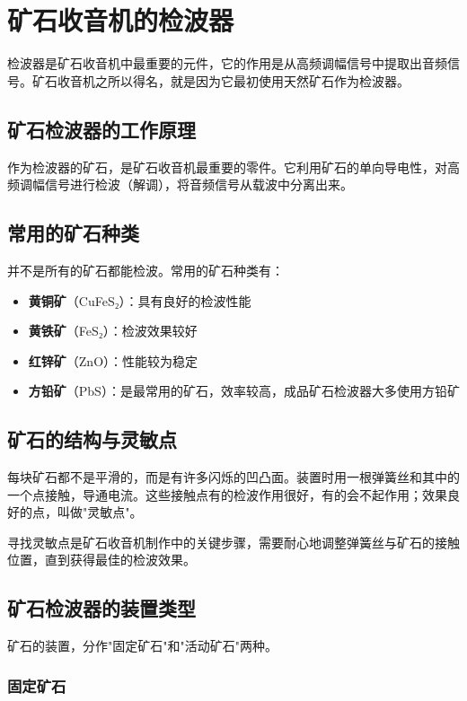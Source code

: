 \documentclass[12pt,UTF8]{ctexbook}
\begin{document}
\chapter{矿石收音机的检波器}

检波器是矿石收音机中最重要的元件，它的作用是从高频调幅信号中提取出音频信号。矿石收音机之所以得名，就是因为它最初使用天然矿石作为检波器。

\section{矿石检波器的工作原理}

作为检波器的矿石，是矿石收音机最重要的零件。它利用矿石的单向导电性，对高频调幅信号进行检波（解调），将音频信号从载波中分离出来。

\section{常用的矿石种类}

并不是所有的矿石都能检波。常用的矿石种类有：

\begin{itemize}
	\item \textbf{黄铜矿}（CuFeS₂）：具有良好的检波性能
	\item \textbf{黄铁矿}（FeS₂）：检波效果较好
	\item \textbf{红锌矿}（ZnO）：性能较为稳定
	\item \textbf{方铅矿}（PbS）：是最常用的矿石，效率较高，成品矿石检波器大多使用方铅矿
\end{itemize}

\section{矿石的结构与灵敏点}

每块矿石都不是平滑的，而是有许多闪烁的凹凸面。装置时用一根弹簧丝和其中的一个点接触，导通电流。这些接触点有的检波作用很好，有的会不起作用；效果良好的点，叫做"灵敏点"。

寻找灵敏点是矿石收音机制作中的关键步骤，需要耐心地调整弹簧丝与矿石的接触位置，直到获得最佳的检波效果。

\section{矿石检波器的装置类型}

矿石的装置，分作"固定矿石"和"活动矿石"两种。

\subsection{固定矿石}
\end{document}
